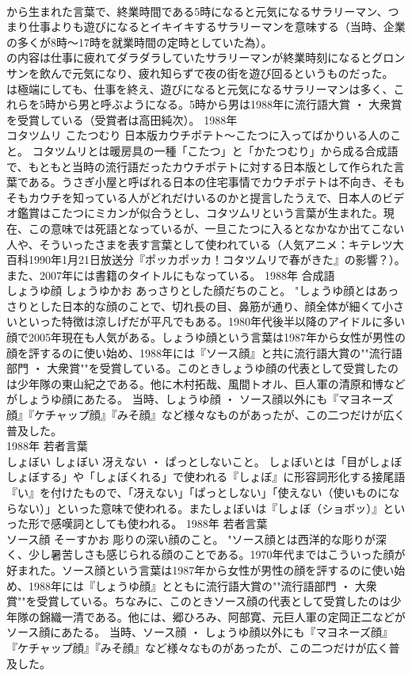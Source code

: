 \documentclass[8pt]{extreport}
\begin{document}
\begin{CJK}{UTF8}{min}
\\	から生まれた言葉で、終業時間である5時になると元気になるサラリーマン、つまり仕事よりも遊びになるとイキイキするサラリーマンを意味する（当時、企業の多くが8時～17時を就業時間の定時としていた為）。
\\	の内容は仕事に疲れてダラダラしていたサラリーマンが終業時刻になるとグロンサンを飲んで元気になり、疲れ知らずで夜の街を遊び回るというものだった。
\\	は極端にしても、仕事を終え、遊びになると元気になるサラリーマンは多く、これらを5時から男と呼ぶようになる。5時から男は1988年に流行語大賞 ・ 大衆賞を受賞している（受賞者は高田純次）。	1988年	
\\	コタツムリ	こたつむり	日本版カウチポテト～こたつに入ってばかりいる人のこと。	コタツムリとは暖房具の一種「こたつ」と「かたつむり」から成る合成語で、もともと当時の流行語だったカウチポテトに対する日本版として作られた言葉である。うさぎ小屋と呼ばれる日本の住宅事情でカウチポテトは不向き、そもそもカウチを知っている人がどれだけいるのかと提言したうえで、日本人のビデオ鑑賞はこたつにミカンが似合うとし、コタツムリという言葉が生まれた。現在、この意味では死語となっているが、一旦こたつに入るとなかなか出てこない人や、そういったさまを表す言葉として使われている（人気アニメ：キテレツ大百科1990年1月21日放送分『ポッカポッカ！コタツムリで春がきた』の影響？）。また、2007年には書籍のタイトルにもなっている。	1988年	合成語	
\\	しょうゆ顔	しょうゆかお	あっさりとした顔だちのこと。	"しょうゆ顔とはあっさりとした日本的な顔のことで、切れ長の目、鼻筋が通り、顔全体が細くて小さいといった特徴は涼しげだが平凡でもある。1980年代後半以降のアイドルに多い顔で2005年現在も人気がある。しょうゆ顔という言葉は1987年から女性が男性の顔を評するのに使い始め、1988年には『ソース顔』と共に流行語大賞の""流行語部門 ・ 大衆賞""を受賞している。このときしょうゆ顔の代表として受賞したのは少年隊の東山紀之である。他に木村拓哉、風間トオル、巨人軍の清原和博などがしょうゆ顔にあたる。 当時、しょうゆ顔 ・ ソース顔以外にも『マヨネーズ顔』『ケチャップ顔』『みそ顔』など様々なものがあったが、この二つだけが広く普及した。
\\	1988年	若者言葉	
\\	しょぼい	しょぼい	冴えない ・ ぱっとしないこと。	しょぼいとは「目がしょぼしょぼする」や「しょぼくれる」で使われる『しょぼ』に形容詞形化する接尾語『い』を付けたもので、「冴えない」「ぱっとしない」「使えない（使いものにならない）」といった意味で使われる。またしょぼいは『しょぼ（ショボッ）』といった形で感嘆詞としても使われる。	1988年	若者言葉	
\\	ソース顔	そーすかお	彫りの深い顔のこと。	"ソース顔とは西洋的な彫りが深く、少し暑苦しさも感じられる顔のことである。1970年代まではこういった顔が好まれた。ソース顔という言葉は1987年から女性が男性の顔を評するのに使い始め、1988年には『しょうゆ顔』とともに流行語大賞の""流行語部門 ・ 大衆賞""を受賞している。ちなみに、このときソース顔の代表として受賞したのは少年隊の錦織一清である。他には、郷ひろみ、阿部寛、元巨人軍の定岡正二などがソース顔にあたる。 当時、ソース顔 ・ しょうゆ顔以外にも『マヨネーズ顔』『ケチャップ顔』『みそ顔』など様々なものがあったが、この二つだけが広く普及した。

\end{CJK}
\end{document}

